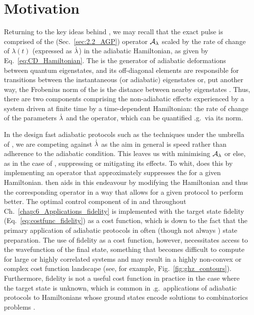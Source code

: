 \section{Motivation}\label{sec:5.1_motivation}

Returning to the key ideas behind , we may recall that the exact  pulse is comprised of the  (Sec.~\ref{sec:2.2_AGP}) operator $\mathcal{A}_{\lambda}$ scaled by the rate of change of $\lambda(t)$ (expressed as $\dot{\lambda}$) in the adiabatic Hamiltonian, as given by Eq.~\eqref{eq:CD_Hamiltonian}. The  is the generator of adiabatic deformations between quantum eigenstates, and its off-diagonal elements are responsible for transitions between the instantaneous (or adiabatic) eigenstates or, put another way, the Frobenius norm of the  is the distance between nearby eigenstates \cite{pandey_adiabatic_2020, nandy_delayed_2022}. Thus, there are two components comprising the non-adiabatic effects experienced by a system driven at finite time by a time-dependent Hamiltonian: the rate of change of the parameters $\dot{\lambda}$ and the  operator, which can be quantified \@e.g.~via its norm. 

In the design fast adiabatic protocols such as the techniques under the umbrella of , we are competing against $\dot{\lambda}$ as the aim in general is speed rather than adherence to the adiabatic condition. This leaves us with minimising $\mathcal{A}_{\lambda}$ or else, as in the case of , suppressing or mitigating its effects. To whit,  does this by implementing an operator that approximately suppresses the  for a given Hamiltonian.  then aids in this endeavour by modifying the Hamiltonian and thus the corresponding  operator in a way that allows for a given  protocol to perform better. The optimal control component of  in \cite{cepaite_cold_2023} and throughout Ch.~\ref{chap:6_Applications_fidelity} is implemented with the target state fidelity (Eq.~\eqref{eq:costfunc_fidelity}) as a cost function, which is down to the fact that the primary application of adiabatic protocols in often (though not always \cite{pelegri_high-fidelity_2022}) state preparation. The use of fidelity as a cost function, however, necessitates access to the wavefunction of the final state, something that becomes difficult to compute for large or highly correlated systems and may result in a highly non-convex or complex cost function landscape (see, for example, Fig.~\ref{fig:ghz_contours}). Furthermore, fidelity is not a useful cost function in practice in the case where the target state is unknown, which is common in \@e.g.~applications of adiabatic protocols to Hamiltonians whose ground states encode solutions to combinatorics problems \cite{ebadi_quantum_2022, albash_adiabatic_2018}. 

